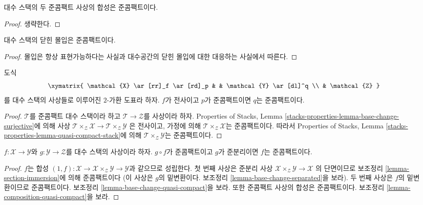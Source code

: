 \begin{lemma}
\label{lemma-composition-quasi-compact}
대수 스택의 두 준콤팩트 사상의 합성은 준콤팩트이다.
\end{lemma}

\begin{proof}
생략한다.
\end{proof}

\begin{lemma}
\label{lemma-closed-immersion-quasi-compact}
대수 스택의 닫힌 몰입은 준콤팩트이다.
\end{lemma}

\begin{proof}
몰입은 항상 표현가능하다는 사실과 대수공간의 닫힌 몰입에 대한
대응하는 사실에서 따른다.
\end{proof}

\begin{lemma}
\label{lemma-surjection-from-quasi-compact}
도식
$$
\xymatrix{
\mathcal{X} \ar[rr]_f \ar[rd]_p & &
\mathcal{Y} \ar[dl]^q \\
& \mathcal{Z}
}
$$
를 대수 스택의 사상들로 이루어진 $2$-가환 도표라 하자.
$f$가 전사이고 $p$가 준콤팩트이면 $q$는 준콤팩트이다.
\end{lemma}

\begin{proof}
$\mathcal{T}$를 준콤팩트 대수 스택이라 하고
$\mathcal{T} \to \mathcal{Z}$를 사상이라 하자. Properties of Stacks,
Lemma \ref{stacks-properties-lemma-base-change-surjective}에 의해 사상
$\mathcal{T} \times_\mathcal{Z} \mathcal{X} \to
\mathcal{T} \times_\mathcal{Z} \mathcal{Y}$
은 전사이고, 가정에 의해 $\mathcal{T} \times_\mathcal{Z} \mathcal{X}$는
준콤팩트이다. 따라서 Properties of Stacks, Lemma
\ref{stacks-properties-lemma-quasi-compact-stack}에 의해
$\mathcal{T} \times_\mathcal{Z} \mathcal{Y}$는 준콤팩트이다.
\end{proof}

\begin{lemma}
\label{lemma-quasi-compact-permanence}
$f : \mathcal{X} \to \mathcal{Y}$와
$g : \mathcal{Y} \to \mathcal{Z}$를 대수 스택의 사상이라 하자.
$g \circ f$가 준콤팩트이고 $g$가 준분리이면 $f$는 준콤팩트이다.
\end{lemma}

\begin{proof}
$f$는 합성
$(1, f) : \mathcal{X} \to \mathcal{X} \times_\mathcal{Z} \mathcal{Y} \to
\mathcal{Y}$과 같으므로 성립한다. 첫 번째 사상은 준분리 사상
$\mathcal{X} \times_\mathcal{Z} \mathcal{Y} \to \mathcal{X}$
의 단면이므로 보조정리 \ref{lemma-section-immersion}에 의해 준콤팩트이다
(이 사상은 $g$의 밑변환이다. 보조정리
\ref{lemma-base-change-separated}을 보라). 두 번째 사상은 $f$의
밑변환이므로 준콤팩트이다. 보조정리
\ref{lemma-base-change-quasi-compact}을 보라. 또한 준콤팩트 사상의 합성은
준콤팩트이다. 보조정리 \ref{lemma-composition-quasi-compact}을 보라.
\end{proof}

